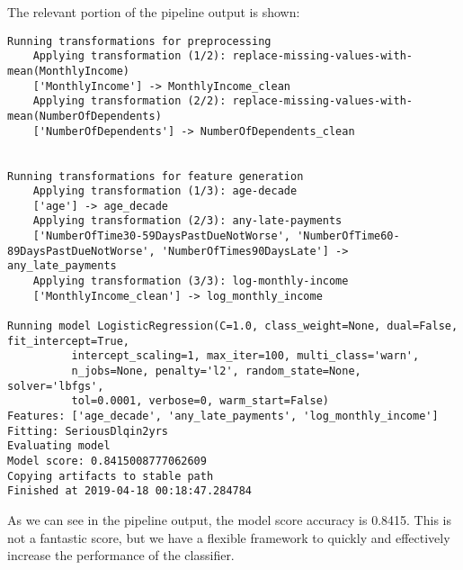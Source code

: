 \documentclass[11pt]{article}
\begin{document}
The relevant portion of the pipeline output is shown:

\begin{lstlisting}[numbers=none]
Running transformations for preprocessing
    Applying transformation (1/2): replace-missing-values-with-mean(MonthlyIncome) 
    ['MonthlyIncome'] -> MonthlyIncome_clean
    Applying transformation (2/2): replace-missing-values-with-mean(NumberOfDependents) 
    ['NumberOfDependents'] -> NumberOfDependents_clean


Running transformations for feature generation
    Applying transformation (1/3): age-decade 
    ['age'] -> age_decade
    Applying transformation (2/3): any-late-payments 
    ['NumberOfTime30-59DaysPastDueNotWorse', 'NumberOfTime60-89DaysPastDueNotWorse', 'NumberOfTimes90DaysLate'] -> any_late_payments
    Applying transformation (3/3): log-monthly-income 
    ['MonthlyIncome_clean'] -> log_monthly_income

Running model LogisticRegression(C=1.0, class_weight=None, dual=False, fit_intercept=True,
          intercept_scaling=1, max_iter=100, multi_class='warn',
          n_jobs=None, penalty='l2', random_state=None, solver='lbfgs',
          tol=0.0001, verbose=0, warm_start=False)
Features: ['age_decade', 'any_late_payments', 'log_monthly_income']
Fitting: SeriousDlqin2yrs
Evaluating model
Model score: 0.8415008777062609
Copying artifacts to stable path
Finished at 2019-04-18 00:18:47.284784
\end{lstlisting}

As we can see in the pipeline output, the model score accuracy is 0.8415. This is not a fantastic score, but we have a flexible framework to quickly and effectively increase the performance of the classifier.
\end{document}
